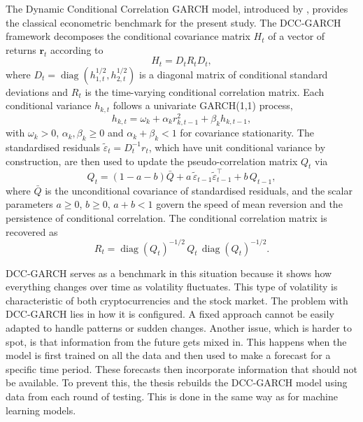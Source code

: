 The Dynamic Conditional Correlation GARCH model, introduced by \cite{engle2002}, provides the classical econometric benchmark for the present study. The DCC-GARCH framework decomposes the conditional covariance matrix $H_t$ of a vector of returns $\mathbf{r}_t$ according to
\begin{equation}
    H_t = D_t R_t D_t,
\end{equation}
where $D_t = \operatorname{diag}(h_{1,t}^{1/2}, h_{2,t}^{1/2})$ is a diagonal matrix of conditional standard deviations and $R_t$ is the time-varying conditional correlation matrix. Each conditional variance $h_{k,t}$ follows a univariate GARCH(1,1) process,
\begin{equation}
    h_{k,t} = \omega_k + \alpha_k r_{k,t-1}^{2} + \beta_k h_{k,t-1},
\end{equation}
with $\omega_k > 0$, $\alpha_k, \beta_k \geq 0$ and $\alpha_k + \beta_k < 1$ for covariance stationarity. The standardised residuals $\tilde{\varepsilon}_t = D_t^{-1} r_t$, which have unit conditional variance by construction, are then used to update the pseudo-correlation matrix $Q_t$ via
\begin{equation}
    Q_t = (1 - a - b)\bar{Q} + a\,\tilde{\varepsilon}_{t-1}\tilde{\varepsilon}_{t-1}^{\top} + b\, Q_{t-1},
\end{equation}
where $\bar{Q}$ is the unconditional covariance of standardised residuals, and the scalar parameters $a \geq 0$, $b \geq 0$, $a + b < 1$ govern the speed of mean reversion and the persistence of conditional correlation. The conditional correlation matrix is recovered as
\begin{equation}
    R_t = \operatorname{diag}(Q_t)^{-1/2}\, Q_t\, \operatorname{diag}(Q_t)^{-1/2}.
\end{equation}

DCC-GARCH serves as a benchmark in this situation because it shows how everything changes over time as volatility fluctuates. This type of volatility is characteristic of both cryptocurrencies and the stock market. The problem with DCC-GARCH lies in how it is configured. A fixed approach cannot be easily adapted to handle patterns or sudden changes. Another issue, which is harder to spot, is that information from the future gets mixed in. This happens when the model is first trained on all the data and then used to make a forecast for a specific time period. These forecasts then incorporate information that should not be available. To prevent this, the thesis rebuilds the DCC-GARCH model using data from each round of testing. This is done in the same way as for machine learning models.

